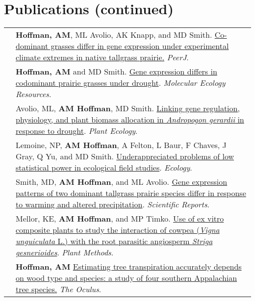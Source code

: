 \documentclass[letterpaper]{deedy-resume} %
\begin{document}
\section{Publications (continued)}
\begin{tabular}{>{\raggedleft\arraybackslash}p{2cm}p{16cm}}

2018 & \textbf{Hoffman, AM}, ML Avolio, AK Knapp, and MD Smith. \href{https://peerj.com/articles/4394.pdf}{Co-dominant grasses differ in gene expression under experimental climate extremes in native tallgrass prairie.} \textcolor{special}{\textit{PeerJ}}.\\

2017 & \textbf{Hoffman, AM} and MD Smith. \href{http://onlinelibrary.wiley.com/doi/10.1111/1755-0998.12733/full}{Gene expression differs in codominant prairie grasses under drought}. \textcolor{special}{\textit{Molecular Ecology Resources}}.\\

2017 & Avolio, ML, \textbf{AM Hoffman}, MD Smith. \href{https://link.springer.com/article/10.1007/s11258-017-0773-3}{Linking gene regulation, physiology, and plant biomass allocation in \textit{Andropogon gerardii} in response to drought}. \textcolor{special}{\textit{Plant Ecology}}. \\

2016 & Lemoine, NP, \textbf{AM Hoffman}, A Felton, L Baur, F Chaves, J Gray, Q Yu, and MD Smith. \href{http://onlinelibrary.wiley.com/doi/10.1002/ecy.1506/full}{Underappreciated problems of low statistical power in ecological field studies}. \textcolor{special}{\textit{Ecology}}. \\

2016 & Smith, MD, \textbf{AM Hoffman}, and ML Avolio. \href{http://www.nature.com/articles/srep25522}{Gene expression patterns of two dominant tallgrass prairie species differ in response to warming and altered precipitation}. \textcolor{special}{\textit{Scientific Reports}}.\\

2012 & Mellor, KE, \textbf{AM Hoffman}, and MP Timko. \href{http://www.plantmethods.com/content/pdf/1746-4811-8-22.pdf}{Use of ex vitro composite plants to study the interaction of cowpea (\textit{Vigna unguiculata} L.) with the root parasitic angiosperm \textit{Striga gesnerioides}}. \textcolor{special}{\textit{Plant Methods}}. \\

2012 & \textbf{Hoffman, AM} \href{http://issuu.com/theoculus/docs/spring2012/}{Estimating tree transpiration accurately depends on wood type and species: a study of four southern Appalachian tree species.} \textcolor{special}{\textit{The Oculus}}.\\


\end{tabular}
\end{document}
